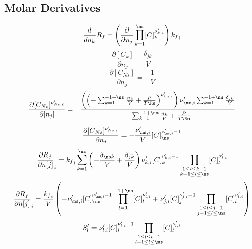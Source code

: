 \documentclass[a4paper,10pt]{article}
\begin{document}
\subsection{Molar Derivatives}
\begin{dmath} \frac{d}{d n_{k}} {R_f} = \left(\frac{\partial}{\partial n_{j}} \prod_{k=1}^{\ns} [C]_{k}^{\nu^{\prime}_{k,i}}\right) {k_f}_{i}\end{dmath} 
\begin{dmath} \frac{\partial [C_k]}{\partial n_j} =\frac{\delta_{j k}}{V}\end{dmath} 
\begin{dmath} \frac{\partial [C_{Ns}]}{\partial n_j} =- \frac{1}{V}\end{dmath} 
\begin{dmath} \frac{\partial [C_{Ns}]^{\nu^{\prime}_{Ns, i}}}{\partial [n_j]} =- \frac{\left(\left(- \sum_{k=1}^{-1 + \ns} \frac{n_{k}}{V} + \frac{P}{T \Ru}\right)^{\nu^{\prime}_{\ns,i}}\right) \nu^{\prime}_{\ns,i} \sum_{k=1}^{-1 + \ns} \frac{\delta_{j k}}{V}}{- \sum_{k=1}^{-1 + \ns} \frac{n_{k}}{V} + \frac{P}{T \Ru}}\end{dmath} 
\begin{dmath} \frac{\partial [C_{Ns}]^{\nu^{\prime}_{Ns, i}}}{\partial n_j} =- \frac{\nu^{\prime}_{\ns,i}}{V} [C]_{\ns}^{\nu^{\prime}_{\ns,i} - 1}\end{dmath} 
\begin{dmath} \frac{\partial {R_f} }{\partial n[j] }_{i} = {k_f}_{i} \sum_{k=1}^{\ns} \left(- \frac{\delta_{\ns k}}{V} + \frac{\delta_{j k}}{V}\right) \nu^{\prime}_{k,i} [C]_{k}^{\nu^{\prime}_{k,i} - 1} \prod_{\substack{1 \leq l \leq k - 1\\k + 1 \leq l \leq \ns}} [C]_{l}^{\nu^{\prime}_{l,i}}\end{dmath} 
\begin{dmath} \frac{\partial {R_f} }{\partial n[j] }_{i} = \frac{{k_f}_{i}}{V} \left(- \nu^{\prime}_{\ns,i} [C]_{\ns}^{\nu^{\prime}_{\ns,i} - 1} \prod_{l=1}^{-1 + \ns} [C]_{l}^{\nu^{\prime}_{l,i}} + \nu^{\prime}_{j,i} [C]_{j}^{\nu^{\prime}_{j,i} - 1} \prod_{\substack{1 \leq l \leq j - 1\\j + 1 \leq l \leq \ns}} [C]_{l}^{\nu^{\prime}_{l,i}}\right)\end{dmath} 
\begin{dmath} S^{\prime}_{l} = \nu^{\prime}_{l,i} [C]_{l}^{\nu^{\prime}_{l,i} - 1} \prod_{\substack{1 \leq l \leq l - 1\\l + 1 \leq l \leq \ns}} [C]_{l}^{\nu^{\prime}_{l,i}}\end{dmath} 
\end{document}
